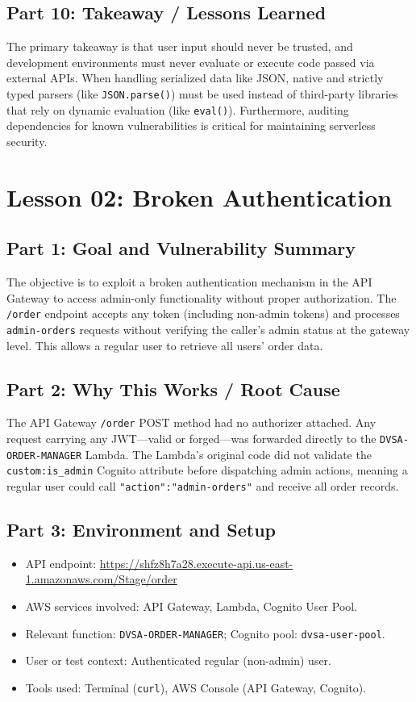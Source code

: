 \documentclass[12pt]{report}
\begin{document}
\section{Part 10: Takeaway / Lessons Learned}
The primary takeaway is that user input should never be trusted, and development environments must never evaluate or execute code passed via external APIs. When handling serialized data like JSON, native and strictly typed parsers (like \texttt{JSON.parse()}) must be used instead of third-party libraries that rely on dynamic evaluation (like \texttt{eval()}). Furthermore, auditing dependencies for known vulnerabilities is critical for maintaining serverless security.

\clearpage

\chapter{Lesson 02: Broken Authentication}

\section{Part 1: Goal and Vulnerability Summary}
The objective is to exploit a broken authentication mechanism in the API Gateway to access admin-only functionality without proper authorization. The \texttt{/order} endpoint accepts any token (including non-admin tokens) and processes \texttt{admin-orders} requests without verifying the caller's admin status at the gateway level. This allows a regular user to retrieve all users' order data.

\section{Part 2: Why This Works / Root Cause}
The API Gateway \texttt{/order} POST method had no authorizer attached. Any request carrying any JWT---valid or forged---was forwarded directly to the \texttt{DVSA-ORDER-MANAGER} Lambda. The Lambda's original code did not validate the \texttt{custom:is\_admin} Cognito attribute before dispatching admin actions, meaning a regular user could call \texttt{"action":"admin-orders"} and receive all order records.

\section{Part 3: Environment and Setup}
\begin{itemize}
  \item API endpoint: \url{https://shfz8h7a28.execute-api.us-east-1.amazonaws.com/Stage/order}
  \item AWS services involved: API Gateway, Lambda, Cognito User Pool.
  \item Relevant function: \texttt{DVSA-ORDER-MANAGER}; Cognito pool: \texttt{dvsa-user-pool}.
  \item User or test context: Authenticated regular (non-admin) user.
  \item Tools used: Terminal (\texttt{curl}), AWS Console (API Gateway, Cognito).
\end{itemize}
\end{document}
